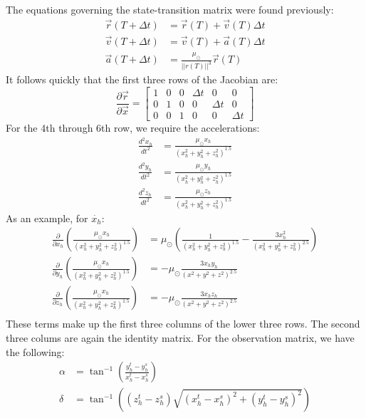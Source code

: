 \documentclass[a4paper,10pt]{article}
\begin{document}
The equations governing the state-transition matrix were found previously:
\begin{align}
 \vec{r}(T+\Delta t) &= \vec{r}(T) + \vec{v}(T)\Delta t \\
 \vec{v}(T+\Delta t) &= \vec{v}(T) + \vec{a}(T)\Delta t \\
 \vec{a}(T+\Delta t) &= \frac{\mu_\odot}{||r(T)||^3}\vec{r}(T)
\end{align}
It follows quickly that the first three rows of the Jacobian are:
\begin{equation}
 \frac{\partial \vec{r}}{\partial \vec{x}} = 
 \begin{bmatrix}
  1 & 0 & 0 & \Delta t & 0 & 0 \\
  0 & 1 & 0 & 0 & \Delta t & 0 \\
  0 & 0 & 1 & 0 & 0 & \Delta t
 \end{bmatrix}
\end{equation}
For the 4th through 6th row, we require the accelerations:
\begin{align}
 \frac{d^2 x_h}{dt^2} &= \frac{\mu_\odot x_h}{\left(x_h^2 + y_h^2 + z_h^2\right)^{1.5}} \\
 \frac{d^2 y_h}{dt^2} &= \frac{\mu_\odot y_h}{\left(x_h^2 + y_h^2 + z_h^2\right)^{1.5}} \\
 \frac{d^2 z_h}{dt^2} &= \frac{\mu_\odot z_h}{\left(x_h^2 + y_h^2 + z_h^2\right)^{1.5}}
\end{align}
As an example, for $\dot{x_h}$:
\begin{align}
 \frac{\partial}{\partial x_h} \left(\frac{\mu_\odot x_h}{\left(x_h^2 + y_h^2 + z_h^2\right)^{1.5}}\right) &=
 \mu_\odot \left(\frac{1}{\left(x_h^2 + y_h^2 + z_h^2\right)^{1.5}} - \frac{3x_h^2}{\left(x_h^2 + y_h^2 + z_h^2\right)^{2.5}}\right) \\
 \frac{\partial}{\partial y_h} \left(\frac{\mu_\odot x_h}{\left(x_h^2 + y_h^2 + z_h^2\right)^{1.5}}\right) &=
 -\mu_\odot\frac{3 x_h y_h}{\left(x^2 + y^2 + z^2\right)^{2.5}} \\
 \frac{\partial}{\partial z_h} \left(\frac{\mu_\odot x_h}{\left(x_h^2 + y_h^2 + z_h^2\right)^{1.5}}\right) &=
 -\mu_\odot\frac{3 x_h z_h}{\left(x^2 + y^2 + z^2\right)^{2.5}} \\
\end{align}
These terms make up the first three columns of the lower three rows. The second three colums are again the identity matrix. For the observation matrix, we have the following:
\begin{align}
 \alpha &= \tan ^{-1} \left( \frac{ y_h^t - y_h^s}{x_h^t - x_h^s}\right) \\
 \delta &= \tan^{-1}\left(\left(z_h^t - z_h^s\right)\sqrt{\left(x_h^t - x_h^s\right)^2 + \left(y_h^t - y_h^s\right)^2}\right)
\end{align}
\end{document}
